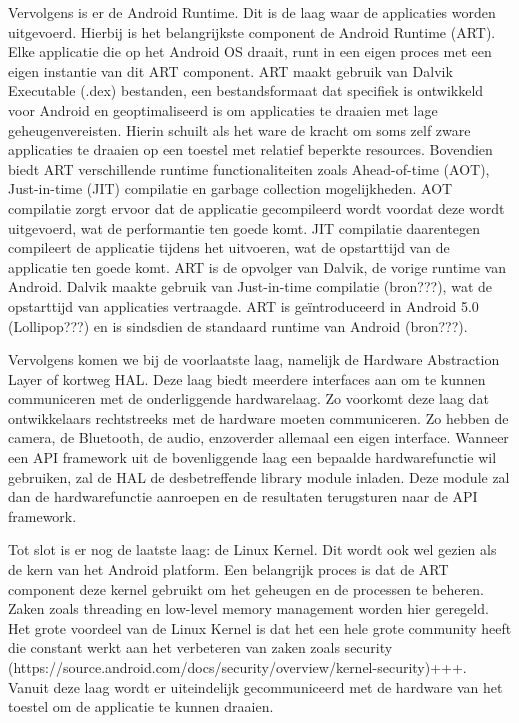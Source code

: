 Vervolgens is er de Android Runtime. Dit is de laag waar de applicaties worden uitgevoerd. Hierbij is het belangrijkste component de Android Runtime (ART). Elke applicatie die op het Android OS draait, runt in een eigen proces met een eigen instantie van dit ART component. ART maakt gebruik van Dalvik Executable (.dex) bestanden, een bestandsformaat dat specifiek is ontwikkeld voor Android en geoptimaliseerd is om applicaties te draaien met lage geheugenvereisten. Hierin schuilt als het ware de kracht om soms zelf zware applicaties te draaien op een toestel met relatief beperkte resources. Bovendien biedt ART verschillende runtime functionaliteiten zoals Ahead-of-time (AOT), Just-in-time (JIT) compilatie en garbage collection mogelijkheden. AOT compilatie zorgt ervoor dat de applicatie gecompileerd wordt voordat deze wordt uitgevoerd, wat de performantie ten goede komt. JIT compilatie daarentegen compileert de applicatie tijdens het uitvoeren, wat de opstarttijd van de applicatie ten goede komt. ART is de opvolger van Dalvik, de vorige runtime van Android. Dalvik maakte gebruik van Just-in-time compilatie (bron???), wat de opstarttijd van applicaties vertraagde. ART is geïntroduceerd in Android 5.0 (Lollipop???) en is sindsdien de standaard runtime van Android (bron???).

Vervolgens komen we bij de voorlaatste laag, namelijk de Hardware Abstraction Layer of kortweg HAL. Deze laag biedt meerdere interfaces aan om te kunnen communiceren met de onderliggende hardwarelaag. Zo voorkomt deze laag dat ontwikkelaars rechtstreeks met de hardware moeten communiceren. Zo hebben de camera, de Bluetooth, de audio, enzoverder allemaal een eigen interface. Wanneer een API framework uit de bovenliggende laag een bepaalde hardwarefunctie wil gebruiken, zal de HAL de desbetreffende library module inladen. Deze module zal dan de hardwarefunctie aanroepen en de resultaten terugsturen naar de API framework.

Tot slot is er nog de laatste laag: de Linux Kernel. Dit wordt ook wel gezien als de kern van het Android platform. Een belangrijk proces is dat de ART component deze kernel gebruikt om het geheugen en de processen te beheren. Zaken zoals threading en low-level memory management worden hier geregeld. Het grote voordeel van de Linux Kernel is dat het een hele grote community heeft die constant werkt aan het verbeteren van zaken zoals security (https://source.android.com/docs/security/overview/kernel-security)+++. Vanuit deze laag wordt er uiteindelijk gecommuniceerd met de hardware van het toestel om de applicatie te kunnen draaien.

